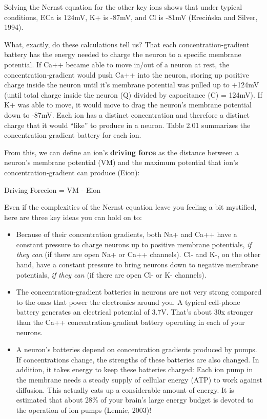 \documentclass[
]{book}
\providecommand{\tightlist}{%
  \setlength{\itemsep}{0pt}\setlength{\parskip}{0pt}}
\begin{document}
Solving the Nernst equation for the other key ions shows that under typical conditions, ECa is 124mV, K+ is -87mV, and Cl is -81mV (Erecińska and Silver, 1994).

What, exactly, do these calculations tell us? That each concentration-gradient battery has the energy needed to charge the neuron to a specific membrane potential. If Ca++ became able to move in/out of a neuron at rest, the concentration-gradient would push Ca++ into the neuron, storing up positive charge inside the neuron until it's membrane potential was pulled up to +124mV (until total charge inside the neuron (Q) divided by capacitance (C) = 124mV). If K+ was able to move, it would move to drag the neuron's membrane potential down to -87mV. Each ion has a distinct concentration and therefore a distinct charge that it would ``like'' to produce in a neuron. Table 2.01 summarizes the concentration-gradient battery for each ion.

From this, we can define an ion's \textbf{driving force }as the distance between a neuron's membrane potential (VM) and the maximum potential that ion's concentration-gradient can produce (Eion):

Driving Forceion = VM - Eion

Even if the complexities of the Nernst equation leave you feeling a bit mystified, here are three key ideas you can hold on to:

\begin{itemize}
\tightlist
\item
  Because of their concentration gradients, both Na+ and Ca++ have a constant pressure to charge neurons up to positive membrane potentials, \emph{if they can} (if there are open Na+ or Ca++ channels). Cl- and K-, on the other hand, have a constant pressure to bring neurons down to negative membrane potentials, \emph{if they can} (if there are open Cl- or K- channels).
\item
  The concentration-gradient batteries in neurons are not very strong compared to the ones that power the electronics around you. A typical cell-phone battery generates an electrical potential of 3.7V. That's about 30x stronger than the Ca++ concentration-gradient battery operating in each of your neurons.
\item
  A neuron's batteries depend on concentration gradients produced by pumps. If concentrations change, the strengths of these batteries are also changed. In addition, it takes energy to keep these batteries charged: Each ion pump in the membrane needs a steady supply of cellular energy (ATP) to work against diffusion. This actually eats up a considerable amount of energy. It is estimated that about 28\% of your brain's large energy budget is devoted to the operation of ion pumps (Lennie, 2003)!
\end{itemize}
\end{document}
